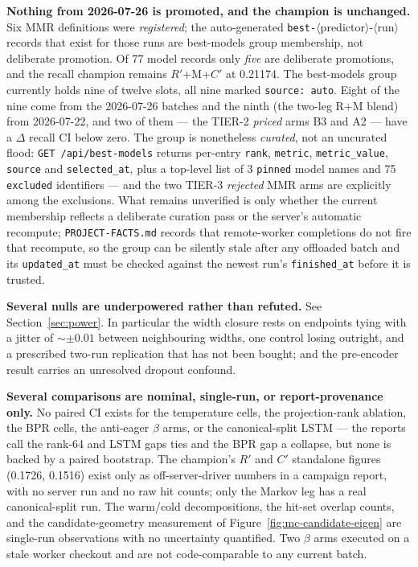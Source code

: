 \documentclass[11pt]{article}
\newcommand{\Rp}{\ensuremath{R'}}
\newcommand{\Cp}{\ensuremath{C'}}
\begin{document}
\textbf{Nothing from 2026-07-26 is promoted, and the champion is unchanged.} Six
MMR definitions were \emph{registered}; the auto-generated
\texttt{best-}$\langle$predictor$\rangle$-$\langle$run$\rangle$ records that
exist for those runs are best-models group membership, not deliberate promotion.
Of \num{77} model records only \emph{five} are deliberate promotions, and the
recall champion remains \Rp+M+\Cp{} at \num{0.21174}. The best-models group
currently holds nine of twelve slots, all nine marked \texttt{source: auto}. Eight
of the nine come from the 2026-07-26 batches and the ninth (the two-leg R+M blend)
from 2026-07-22, and two of them --- the TIER-2 \emph{priced} arms B3 and A2 ---
have a $\Delta$ recall CI below zero. The group is nonetheless \emph{curated}, not
an uncurated flood: \texttt{GET /api/best-models} returns per-entry
\texttt{rank}, \texttt{metric}, \texttt{metric\_value}, \texttt{source} and
\texttt{selected\_at}, plus a top-level list of \num{3} \texttt{pinned} model
names and \num{75} \texttt{excluded} identifiers --- and the two TIER-3
\emph{rejected} MMR arms are explicitly among the exclusions. What remains
unverified is only whether the current membership reflects a deliberate curation
pass or the server's automatic recompute; \texttt{PROJECT-FACTS.md} records that
remote-worker completions do not fire that recompute, so the group can be silently
stale after any offloaded batch and its \texttt{updated\_at} must be checked
against the newest run's \texttt{finished\_at} before it is trusted.

\textbf{Several nulls are underpowered rather than refuted.} See
Section~\ref{sec:power}. In particular the width closure rests on endpoints
tying with a jitter of ${\sim}\pm\num{0.01}$ between neighbouring widths, one
control losing outright, and a prescribed two-run replication that has not been
bought; and the pre-encoder result carries an unresolved dropout confound.

\textbf{Several comparisons are nominal, single-run, or report-provenance only.}
No paired CI exists for the temperature cells, the projection-rank ablation, the
BPR cells, the anti-eager $\beta$ arms, or the canonical-split LSTM --- the
reports call the rank-64 and LSTM gaps ties and the BPR gap a collapse, but none
is backed by a paired bootstrap. The champion's \Rp{} and \Cp{} standalone
figures (\num{0.1726}, \num{0.1516}) exist only as off-server-driver numbers in
a campaign report, with no server run and no raw hit counts; only the Markov leg
has a real canonical-split run. The warm/cold decompositions, the hit-set overlap
counts, and the candidate-geometry measurement of
Figure~\ref{fig:mc-candidate-eigen} are single-run observations with no
uncertainty quantified. Two $\beta$ arms executed on a stale worker checkout and
are not code-comparable to any current batch.
\end{document}
